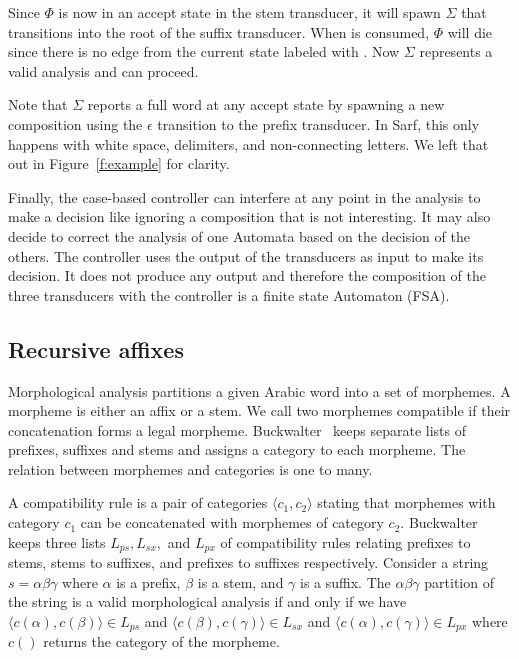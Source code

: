\documentclass[11pt]{article}
\begin{document}
Since $\Phi$ is now in an accept state in the stem transducer, it will
spawn $\Sigma$ that transitions into the root of the 
suffix transducer. When  is consumed, $\Phi$ will die since 
there is no edge from the current state labeled with . 
Now $\Sigma$ represents a valid analysis and can proceed.

Note that $\Sigma$ reports a full word at any accept state
by spawning a new composition using the $\epsilon$ transition
to the prefix transducer.
In Sarf, this only happens with white space, delimiters, 
and non-connecting letters. 
We left that out in Figure~\ref{f:example} for clarity. 

Finally, the case-based controller can interfere at any point in the 
analysis to make a decision like ignoring a composition that 
is not interesting. 
It may also decide to correct the analysis of one Automata
based on the decision of the others. 
The controller uses the output of the transducers as input
to make its decision. 
It does not produce any output and therefore the composition
of the three transducers with the controller is a finite 
state Automaton (FSA). 

\subsection{Recursive affixes}
\label{sec:recaffix}

Morphological analysis partitions a given Arabic word
into a set of morphemes.
A morpheme is either an affix or a stem. 
We call two morphemes compatible if their concatenation
forms a legal morpheme. 
Buckwalter~ keeps separate lists 
of prefixes, suffixes and stems and assigns a category
to each morpheme. 
The relation between morphemes and categories is one 
to many. 

A compatibility rule is a pair of categories 
$\langle c_1, c_2\rangle$  stating that morphemes
with category $c_1$ can be concatenated with morphemes
of category $c_2$. 
Buckwalter keeps three lists $L_{ps}, L_{sx},$ and $L_{px}$ 
of compatibility rules relating
prefixes to stems, stems to suffixes, and prefixes to suffixes
respectively. 
Consider a string $s=\alpha\beta\gamma$ where $\alpha$ is 
a prefix, $\beta$ is a stem, and $\gamma$ is a suffix. 
The $\alpha\beta\gamma$ partition of the string is a 
valid morphological analysis if  and only if we have
$\langle c(\alpha),c(\beta)\rangle \in L_{ps}$ and
$\langle c(\beta),c(\gamma)\rangle \in L_{sx}$ and
$\langle c(\alpha),c(\gamma)\rangle \in L_{px}$ where
$c()$ returns the category of the morpheme.
\end{document}

